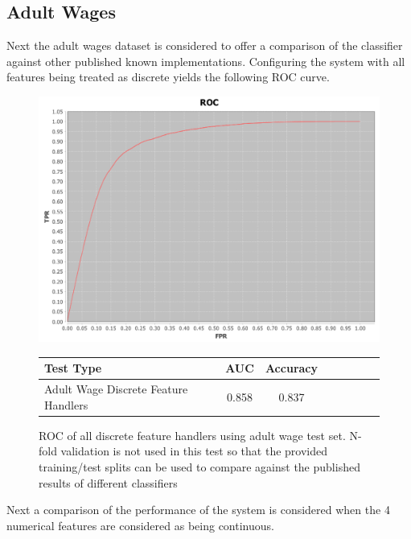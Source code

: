 \documentclass[a4paper,11pt]{scrreprt}
\begin{document}
\subsection{Adult Wages}
Next the adult wages dataset is considered to offer a comparison of the classifier against other published known implementations. Configuring the system with all features being treated as discrete yields the following ROC curve.
\begin{figure}[h!]
\centering
\caption{ROC of all discrete feature handlers using adult wage test set. N-fold validation is not used in this test so that the provided training/test splits can be used to compare against the published results of different classifiers}
\includegraphics[scale=0.45, trim=0 -20 0 0, clip=true] {all_discrete_features_adult_earnings.png}
\label{fig:indexes}
\begin{tabular}{l*{6}{c}r}
Test Type & AUC & Accuracy \\
\hline
Adult Wage Discrete Feature Handlers & 0.858 & 0.837 \\
\end{tabular}
\end{figure}
\clearpage
Next a comparison of the performance of the system is considered when the 4 numerical features are considered as being continuous.
\end{document}
